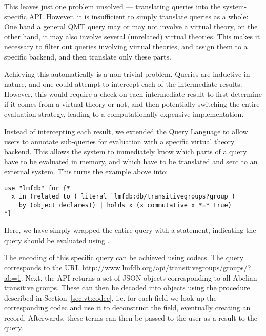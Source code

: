 This leaves just one problem unsolved --- translating queries into the system-specific API. 
However, it is insufficient to simply translate queries as a whole: 
One hand a general QMT query may or may not involve a virtual theory, on the other hand, it may also involve several (unrelated) virtual theories. 
This makes it necessary to filter out queries involving virtual theories, and assign them to a specific backend, and then translate only these parts. 

Achieving this automatically is a non-trivial problem. 
Queries are inductive in nature, and one could attempt to intercept each of the intermediate results. 
However, this would require a check on each intermediate result to first determine if it comes from a virtual theory or not, and then potentially switching the entire evaluation strategy, leading to a computationally expensive implementation. 

Instead of intercepting each result, we extended the Query Language to allow users to annotate sub-queries for evaluation with a specific virtual theory backend. 
This allows the system to immediately know which parts of a query have to be evaluated in \mmt memory, and which have to be translated and sent to an external system. 
This turns the example above into:
\begin{lstlisting}[language=qmt]
use "lmfdb" for {*
  x in (related to ( literal `lmfdb:db/transitivegroups?group ) 
    by (object declares)) | holds x (x commutative x *=* true)
*}
\end{lstlisting}
Here, we have simply wrapped the entire query with a  statement, indicating the query should be evaluated using \lmfdb. 

The encoding of this specific query can be achieved using codecs.
The query corresponds to the URL \url{http://www.lmfdb.org/api/transitivegroups/groups/?ab=1}. 
Next, the \lmfdb API returns a set of JSON objects corresponding to all Abelian transitive groups. 
These can then be decoded into \ommt objects using the procedure described in Section~\ref{sec:vt:codec}, i.e. for each field we look up the corresponding codec and use it to deconstruct the field, eventually creating an \mmt record. 
Afterwards, these \ommt terms can then be passed to the user as a result to the query. 

